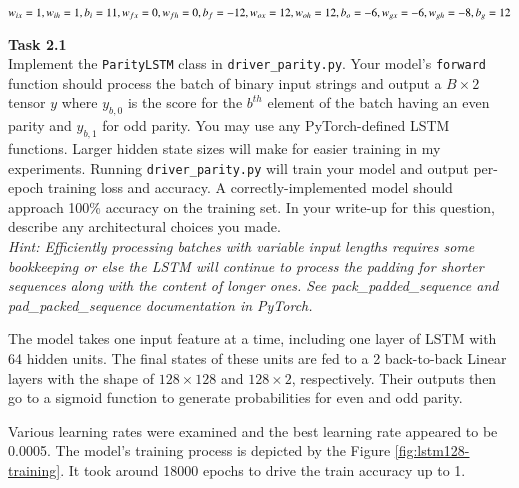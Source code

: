\documentclass[12pt,article]{article}
\newenvironment{task}[2][Task]
    { \begin{mdframed}[backgroundcolor=gray!20] \textbf{#1 #2} \\}
    {  \end{mdframed}}
\begin{document}
$
w_{ix}=1,  w_{ih}=1,  b_{i}=11,  \\
w_{fx}=0,  w_{fh}=0,  b_{f}=-12, \\
w_{ox}=12, w_{oh}=12, b_{o}=-6,  \\
w_{gx}=-6, w_{gh}=-8, b_{g}=12   \\
$

\newpage
\begin{task}{2.1} 
Implement the \texttt{ParityLSTM} class in \texttt{driver\_parity.py}. Your model's \texttt{forward} function should process the batch of binary input strings and output a $B \times 2$ tensor $y$ where $y_{b,0}$ is the score for the $b^{th}$ element of the batch having an even parity and $y_{b,1}$ for odd parity. You may use any PyTorch-defined LSTM functions. Larger hidden state sizes will make for easier training in my experiments. Running \texttt{driver\_parity.py} will train your model and output per-epoch training loss and accuracy. A correctly-implemented model should approach 100\% accuracy on the training set. In your write-up for this question, describe any architectural choices you made.\\[5pt]

\emph{Hint: Efficiently processing batches with variable input lengths requires some bookkeeping or else the LSTM will continue to process the padding for shorter sequences along with the content of longer ones. See pack\_padded\_sequence and pad\_packed\_sequence documentation in PyTorch.}
\end{task}

The model takes one input feature at a time, including one layer of LSTM with 64 hidden units. The final states of these units are fed to a 2 back-to-back Linear layers with the shape of $128 \times 128$ and $128 \times 2$, respectively. Their outputs then go to a sigmoid function to generate probabilities for even and odd parity.

Various learning rates were examined and the best learning rate appeared to be 0.0005. The model's training process is depicted by the Figure \ref{fig:lstm128-training}. It took around 18000 epochs to drive the train accuracy up to 1.
\end{document}
